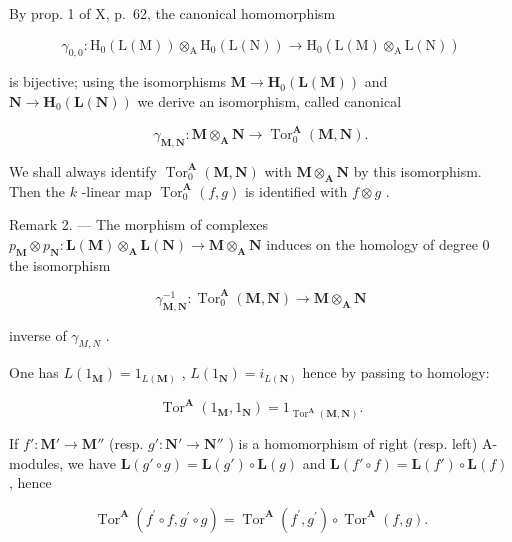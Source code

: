 By prop. 1 of X, p.~62, the canonical homomorphism

\[
\gamma_ {0, 0}: \mathrm{H} _ {0} (\mathrm{L} (\mathrm{M})) \otimes_ {\mathrm{A}} \mathrm{H} _ {0} (\mathrm{L} (\mathrm{N})) \rightarrow \mathrm{H} _ {0} (\mathrm{L} (\mathrm{M}) \otimes_ {\mathrm{A}} \mathrm{L} (\mathrm{N}))
\]

is bijective; using the isomorphisms \(\mathbf{M} \to \mathbf{H}_{0}(\mathbf{L}(\mathbf{M}))\) and \(\mathbf{N} \to \mathbf{H}_{0}(\mathbf{L}(\mathbf{N}))\) we derive an isomorphism, called canonical

\[
\gamma_ {\mathbf {M}, \mathbf {N}}: \mathbf {M} \otimes_ {\mathbf {A}} \mathbf {N} \rightarrow \operatorname{Tor} _ {0} ^ {\mathbf {A}} (\mathbf {M}, \mathbf {N}).\tag{7}
\]

We shall always identify \(\operatorname{Tor}_{0}^{\mathbf{A}}(\mathbf{M},\mathbf{N})\) with \(\mathbf{M}\otimes_{\mathbf{A}}\mathbf{N}\) by this isomorphism. Then the \(k\) -linear map \(\operatorname{Tor}_{0}^{\mathbf{A}}(f,g)\) is identified with \(f\otimes g\) .

Remark 2. --- The morphism of complexes \(p_{\mathbf{M}} \otimes p_{\mathbf{N}}: \mathbf{L}(\mathbf{M}) \otimes_{\mathbf{A}} \mathbf{L}(\mathbf{N}) \to \mathbf{M} \otimes_{\mathbf{A}} \mathbf{N}\) induces on the homology of degree 0 the isomorphism

\[
\gamma_ {\mathbf {M}, \mathbf {N}} ^ {- 1}: \operatorname{Tor} _ {0} ^ {\mathbf {A}} (\mathbf {M}, \mathbf {N}) \rightarrow \mathbf {M} \otimes_ {\mathbf {A}} \mathbf {N}
\]

inverse of \(\gamma_{M,N}\) .

One has \(L(1_{\mathbf{M}}) = 1_{L(\mathbf{M})}\) , \(L(1_{\mathbf{N}}) = i_{L(\mathbf{N})}\) hence by passing to homology:

\[
\operatorname{Tor} ^ {\mathbf {A}} \left(1 _ {\mathbf {M}}, 1 _ {\mathbf {N}}\right) = 1 _ {\operatorname{Tor} ^ {\mathbf {A}} (\mathbf {M}, \mathbf {N})}.\tag{8}
\]

If \(f': \mathbf{M}' \to \mathbf{M}''\) (resp. \(g': \mathbf{N}' \to \mathbf{N}''\) ) is a homomorphism of right (resp. left) A-modules, we have \(\mathbf{L}(g' \circ g) = \mathbf{L}(g') \circ \mathbf{L}(g)\) and \(\mathbf{L}(f' \circ f) = \mathbf{L}(f') \circ \mathbf{L}(f)\) , hence

\[
\operatorname{Tor} ^ {\mathbf {A}} \left(f ^ {\prime} \circ f, g ^ {\prime} \circ g\right) = \operatorname{Tor} ^ {\mathbf {A}} \left(f ^ {\prime}, g ^ {\prime}\right) \circ \operatorname{Tor} ^ {\mathbf {A}} (f, g).\tag{9}
\]

